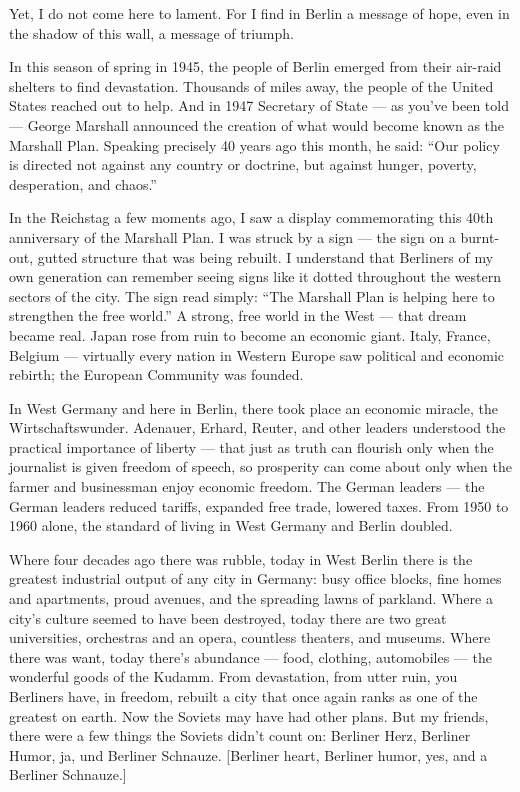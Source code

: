 \documentclass[a4paper]{amsbook}
\begin{document}
Yet, I do not come here to lament. For I find in Berlin a message of hope, even in the shadow of this wall, a message of triumph.

In this season of spring in 1945, the people of Berlin emerged from their air-raid shelters to find devastation. Thousands of miles away, the people of the United States reached out to help. And in 1947 Secretary of State — as you've been told — George Marshall announced the creation of what would become known as the Marshall Plan. Speaking precisely 40 years ago this month, he said: “Our policy is directed not against any country or doctrine, but against hunger, poverty, desperation, and chaos.”

In the Reichstag a few moments ago, I saw a display commemorating this 40th anniversary of the Marshall Plan. I was struck by a sign — the sign on a burnt-out, gutted structure that was being rebuilt. I understand that Berliners of my own generation can remember seeing signs like it dotted throughout the western sectors of the city. The sign read simply: “The Marshall Plan is helping here to strengthen the free world.” A strong, free world in the West — that dream became real. Japan rose from ruin to become an economic giant. Italy, France, Belgium — virtually every nation in Western Europe saw political and economic rebirth; the European Community was founded.

In West Germany and here in Berlin, there took place an economic miracle, the Wirtschaftswunder. Adenauer, Erhard, Reuter, and other leaders understood the practical importance of liberty — that just as truth can flourish only when the journalist is given freedom of speech, so prosperity can come about only when the farmer and businessman enjoy economic freedom. The German leaders — the German leaders reduced tariffs, expanded free trade, lowered taxes. From 1950 to 1960 alone, the standard of living in West Germany and Berlin doubled.

Where four decades ago there was rubble, today in West Berlin there is the greatest industrial output of any city in Germany: busy office blocks, fine homes and apartments, proud avenues, and the spreading lawns of parkland. Where a city's culture seemed to have been destroyed, today there are two great universities, orchestras and an opera, countless theaters, and museums. Where there was want, today there's abundance — food, clothing, automobiles — the wonderful goods of the Kudamm. From devastation, from utter ruin, you Berliners have, in freedom, rebuilt a city that once again ranks as one of the greatest on earth. Now the Soviets may have had other plans. But my friends, there were a few things the Soviets didn't count on: Berliner Herz, Berliner Humor, ja, und Berliner Schnauze. [Berliner heart, Berliner humor, yes, and a Berliner Schnauze.]
\end{document}

